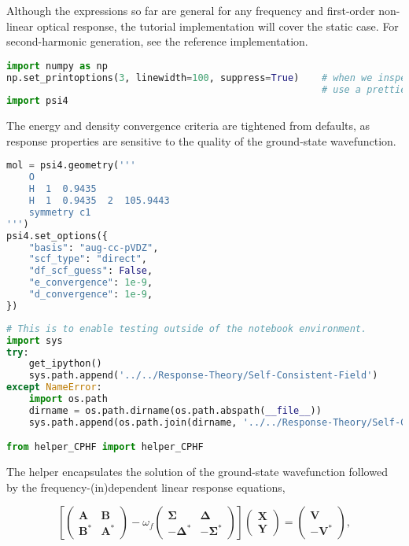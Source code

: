 \documentclass[]{article}
\begin{document}
Although the expressions so far are general for any frequency and
first-order non-linear optical response, the tutorial implementation
will cover the static case. For second-harmonic generation, see the
reference implementation.

\begin{lstlisting}[language=Python]
import numpy as np
np.set_printoptions(3, linewidth=100, suppress=True)    # when we inspect the vectors/matrices,
                                                        # use a prettier format for printing
import psi4
\end{lstlisting}

The energy and density convergence criteria are tightened from defaults,
as response properties are sensitive to the quality of the ground-state
wavefunction.

\begin{lstlisting}[language=Python]
mol = psi4.geometry('''
    O
    H  1  0.9435
    H  1  0.9435  2  105.9443
    symmetry c1
''')
psi4.set_options({
    "basis": "aug-cc-pVDZ",
    "scf_type": "direct",
    "df_scf_guess": False,
    "e_convergence": 1e-9,
    "d_convergence": 1e-9,
})
\end{lstlisting}

\begin{lstlisting}[language=Python]
# This is to enable testing outside of the notebook environment.
import sys
try:
    get_ipython()
    sys.path.append('../../Response-Theory/Self-Consistent-Field')
except NameError:
    import os.path
    dirname = os.path.dirname(os.path.abspath(__file__))
    sys.path.append(os.path.join(dirname, '../../Response-Theory/Self-Consistent-Field'))

from helper_CPHF import helper_CPHF
\end{lstlisting}

The helper encapsulates the solution of the ground-state wavefunction
followed by the frequency-(in)dependent linear response equations,

\[
\left[
\begin{pmatrix}
\mathbf{A} & \mathbf{B} \\
\mathbf{B}^{*} & \mathbf{A}^{*}
\end{pmatrix}
- \omega_{f}
\begin{pmatrix}
\mathbf{\Sigma} & \mathbf{\Delta} \\
-\mathbf{\Delta}^{*} & -\mathbf{\Sigma}^{*}
\end{pmatrix}
\right]
\begin{pmatrix}
\mathbf{X} \\
\mathbf{Y}
\end{pmatrix}
=
\begin{pmatrix}
\mathbf{V} \\
-\mathbf{V}^{*}
\end{pmatrix}
,
\]
\end{document}
